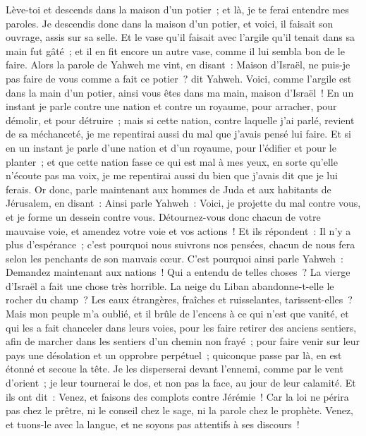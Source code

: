 \begin{multicols}{2}
Lève-toi et descends dans la maison d'un potier~; et là, je te ferai entendre mes paroles.
Je descendis donc dans la maison d'un potier, et voici, il faisait son ouvrage, assis sur sa selle.
Et le vase qu'il faisait avec l'argile qu'il tenait dans sa main fut gâté~; et il en fit encore un autre vase, comme il lui sembla bon de le faire.
Alors la parole de Yahweh me vint, en disant~:
Maison d'Israël, ne puis-je pas faire de vous comme a fait ce potier~? dit Yahweh. Voici, comme l'argile est dans la main d'un potier, ainsi vous êtes dans ma main, maison d'Israël~!
En un instant je parle contre une nation et contre un royaume, pour arracher, pour démolir, et pour détruire~;
mais si cette nation, contre laquelle j'ai parlé, revient de sa méchanceté, je me repentirai aussi du mal que j'avais pensé lui faire.
Et si en un instant je parle d'une nation et d'un royaume, pour l'édifier et pour le planter~;
 et que cette nation fasse ce qui est mal à mes yeux, en sorte qu'elle n'écoute pas ma voix, je me repentirai aussi du bien que j'avais dit que je lui ferais.
Or donc, parle maintenant aux hommes de Juda et aux habitants de Jérusalem, en disant~: Ainsi parle Yahweh~: Voici, je projette du mal contre vous, et je forme un dessein contre vous. Détournez-vous donc chacun de votre mauvaise voie, et amendez votre voie et vos actions~!
Et ils répondent~: Il n'y a plus d'espérance~; c'est pourquoi nous suivrons nos pensées, chacun de nous fera selon les penchants de son mauvais cœur.
C'est pourquoi ainsi parle Yahweh~: Demandez maintenant aux nations~! Qui a entendu de telles choses~? La vierge d'Israël a fait une chose très horrible.
La neige du Liban abandonne-t-elle le rocher du champ~? Les eaux étrangères, fraîches et ruisselantes, tarissent-elles~?
Mais mon peuple m'a oublié, et il brûle de l'encens à ce qui n'est que vanité, et qui les a fait chanceler dans leurs voies, pour les faire retirer des anciens sentiers, afin de marcher dans les sentiers d'un chemin non frayé~;
pour faire venir sur leur pays une désolation et un opprobre perpétuel~; quiconque passe par là, en est étonné et secoue la tête.
Je les disperserai devant l'ennemi, comme par le vent d'orient~; je leur tournerai le dos, et non pas la face, au jour de leur calamité.
Et ils ont dit~: Venez, et faisons des complots contre Jérémie~! Car la loi ne périra pas chez le prêtre, ni le conseil chez le sage, ni la parole chez le prophète. Venez, et tuons-le avec la langue, et ne soyons pas attentifs à ses discours~!

\end{multicols}
